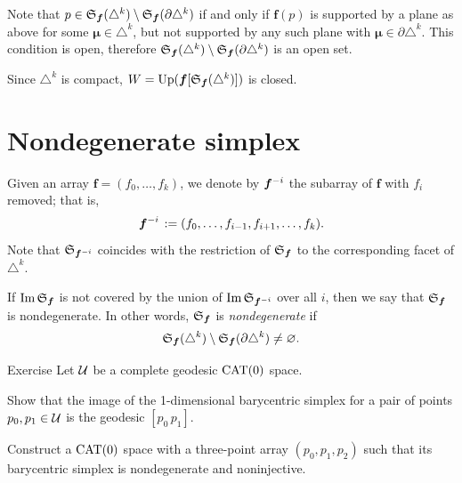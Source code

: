 Note that $p\in \mathfrak{S}_{\bm{f}}(\triangle^k)\setminus\mathfrak{S}_{\bm{f}}(\partial\triangle^k)$ if and only if 
$\bm{f}(p)$ is supported by a plane as above for some $\bm{\mu}\in\triangle^{k}$,
but not supported by any such plane with $\bm{\mu}\in\partial\triangle^{k}$.
This condition is open, therefore $\spx{\bm{f}}(\triangle^k)\z\setminus\spx{\bm{f}}(\partial\triangle^k)$ is an open set.

Since $\triangle^k$ is compact, $W=\mathop{\rm Up}\nolimits(\bm{f}[\mathfrak{S}_{\bm{f}}(\triangle^k)])$ is closed.
\qeds

\section{Nondegenerate simplex}

Given an array $\bm{f}=(f_0,\ldots,f_k)$,
we denote by $\bm{f}^{{-} i}$ the subarray of $\bm{f}$ with $f_i$ removed;
that is, 
\[\bm{f}^{{-} i\,}
\mathrel{:=}
(f_0,\ldots,f_{i-1},f_{i+1},\ldots,f_k).\]
Note that $\mathfrak{S}_{\bm{f}^{{-} i}}$ coincides with the restriction of $\mathfrak{S}_{\bm{f}}$ to the corresponding facet of $\triangle^k$.

If $\operatorname{\rm Im}\nolimits \mathfrak{S}_{\bm{f}}$ is not covered by the union of $\operatorname{\rm Im}\nolimits \mathfrak{S}_{\bm{f}^{{-} i}}$ over all $i$, then we say that $\mathfrak{S}_{\bm{f}}$ is nondegenerate.
In other words, $\mathfrak{S}_{\bm{f}}$ is \emph{nondegenerate} if 
\[\mathfrak{S}_{\bm{f}}(\triangle^k)\setminus \mathfrak{S}_{\bm{f}}(\partial \triangle^k)\ne\varnothing.\]

\begin{thm}{Exercise}\label{ex:barysimple}
Let $\mathcal{U}$ be a complete geodesic $\mathrm{CAT}(0)$ space.

Show that the image of the 1-dimensional barycentric simplex for a pair of points $p_0,p_1\in\mathcal{U}$ is the geodesic $[p_0\,p_1]$.

Construct a $\mathrm{CAT}(0)$ space with a three-point array $(p_0,p_1,p_2)$ such that its barycentric simplex is nondegenerate and noninjective.
\end{thm}

